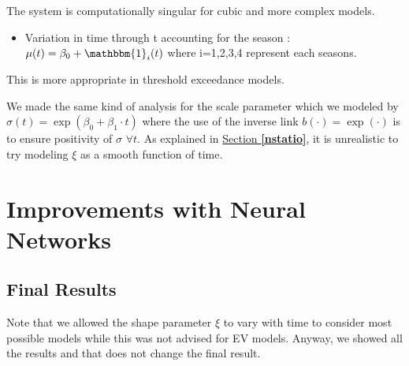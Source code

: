 The system is computationally singular for cubic and more complex models. 

\begin{itemize}
 	\item Variation in time through t accounting for the season : $\mu (t)=\beta_0+\mathbbm{1}_i(t)$ where i=1,2,3,4 represent each
 	 seasons.
\end{itemize}
This is more appropriate in threshold exceedance models.

 
We made the same kind of analysis for the scale parameter which we modeled by $\sigma(t)= \exp(\beta_0+\beta_1\cdot t)$ where the use of the inverse link $b(\cdot)=\exp(\cdot)$ is to ensure positivity of $\sigma$ $\forall t$. As explained in \hyperref[nstatio]{Section \textbf{\ref{nstatio}}}, it is unrealistic to try modeling $\xi$ as a smooth function of time.


\section{Improvements with Neural Networks}\label{sec:nnxp}



\subsection*{Final Results}

Note that we allowed the shape parameter $\xi$ to vary with time to consider most possible models while this was not advised for EV models. Anyway, we showed all the results and that does not change the final result. 

